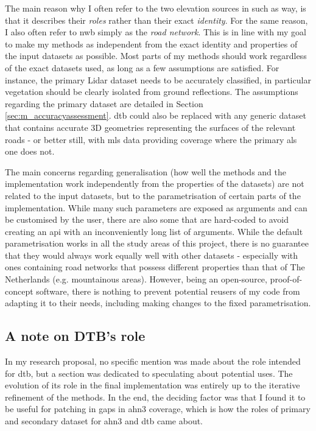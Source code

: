 The main reason why I often refer to the two elevation sources in such as way, is that it describes their \textit{roles} rather than their exact \textit{identity}. For the same reason, I also often refer to \ac{nwb} simply as the \textit{road network}. This is in line with my goal to make my methods as independent from the exact identity and properties of the input datasets as possible. Most parts of my methods should work regardless of the exact datasets used, as long as a few assumptions are satisfied. For instance, the primary Lidar dataset needs to be accurately classified, in particular vegetation should be clearly isolated from ground reflections. The assumptions regarding the primary dataset are detailed in Section \ref{sec:m_accuracyassessment}. \ac{dtb} could also be replaced with any generic dataset that contains accurate 3D geometries representing the surfaces of the relevant roads - or better still, with \ac{mls} data providing coverage where the primary \ac{als} one does not.

The main concerns regarding generalisation (how well the methods and the implementation work independently from the properties of the datasets) are not related to the input datasets, but to the parametrisation of certain parts of the implementation. While many such parameters are exposed as arguments and can be customised by the user, there are also some that are hard-coded to avoid creating an \ac{api} with an inconveniently long list of arguments. While the default parametrisation works in all the study areas of this project, there is no guarantee that they would always work equally well with other datasets - especially with ones containing road networks that possess different properties than that of The Netherlands (e.g. mountainous areas). However, being an open-source, proof-of-concept software, there is nothing to prevent potential reusers of my code from adapting it to their needs, including making changes to the fixed parametrisation.

\subsection{A note on DTB's role}
\label{sub:dtbrole}

In my research proposal, no specific mention was made about the role intended for \ac{dtb}, but a section was dedicated to speculating about potential uses. The evolution of its role in the final implementation was entirely up to the iterative refinement of the methods. In the end, the deciding factor was that I found it to be useful for patching in gaps in \ac{ahn3} coverage, which is how the roles of primary and secondary dataset for \ac{ahn3} and \ac{dtb} came about.

